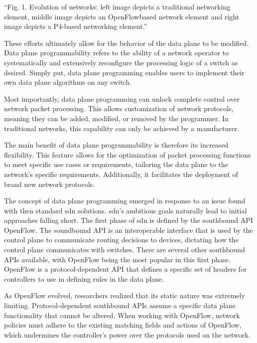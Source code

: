 “Fig. 1. Evolution of networks: left image depicts a traditional networking element, middle image depicts an OpenFlowbased network element and right image depicts a P4-based networking element.” \cite{liatifis_advancing_2023}

These efforts ultimately allow for the behavior of the data plane to be modified. Data plane programmability refers to the ability of a network operator to systematically and extensively reconfigure the processing logic of a switch as desired\cite{bifulco_survey_2018}. Simply put, data plane programming enables users to implement their own data plane algorithms on any switch. \cite{hauser_survey_2021}

Most importantly, data plane programming can unlock complete control over network packet processing. This allows customization of network protocols, meaning they can be added, modified, or removed by the programmer. In traditional networks, this capability can only be achieved by a manufacturer\cite{hauser_survey_2021}. 

The main benefit of data plane programmability is therefore its increased flexibility. This feature allows for the optimization of packet processing functions to meet specific use cases or requirements, tailoring the data plane to the network's specific requirements. Additionally, it facilitates the deployment of brand new network protocols. \cite{bifulco_survey_2018}

The concept of data plane programming emerged in response to an issue found with then standard \gls{sdn} solutions. \gls{sdn}'s ambitious goals naturally lead to initial approaches falling short. The first phase of \gls{sdn} is defined by the southbound API OpenFlow. The soundbound API is an interoperable interface that is used by the control plane to communicate routing decisions to devices, dictating how the control plane communicates with switches. There are several other southbound APIs available, with OpenFlow being the most popular in this first phase. OpenFlow is a protocol-dependent API that defines a specific set of headers for controllers to use in defining rules in the data plane. \cite{li_protocol_2017}

As OpenFlow evolved, researchers realized that its static nature was extremely limiting. Protocol-dependent southbound APIs assume a specific data plane functionality that cannot be altered. When working with OpenFlow, network policies must adhere to the existing matching fields and actions of OpenFlow, which undermines the controller's power over the protocols used on the network.  \cite{bosshart_p4_2014}\cite{hauser_survey_2021}\cite{li_protocol_2017}

